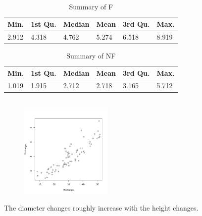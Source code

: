 \documentclass[twocolumn]{article}
\begin{document}
\newpage

\subsection{}
\begin{table}[h]
\begin{tabular}{@{}llllll@{}}
\toprule
Min.  & 1st Qu. & Median & Mean  & 3rd Qu. & Max.  \\ \midrule
2.912 & 4.318   & 4.762  & 5.274 & 6.518   & 8.919 \\ \bottomrule
\end{tabular}
\caption{Summary of F}
\end{table}
\begin{table}[h]
\begin{tabular}{llllll}
\toprule
Min.  & 1st Qu. & Median & Mean  & 3rd Qu. & Max.  \\ \midrule
1.019 & 1.915   & 2.712  & 2.718 & 3.165   & 5.712 \\ \bottomrule
\end{tabular}
\caption{Summary of NF}
\end{table}

\subsection{}
\begin{figure}[h]
\centering
\includegraphics[width=0.4\textwidth]{6e.pdf}
\end{figure}
The diameter changes roughly increase with the height changes.
\end{document}
